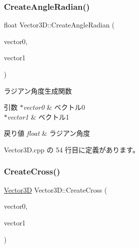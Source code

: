 \subsubsection{\texorpdfstring{Create\+Angle\+Radian()}{CreateAngleRadian()}}
{\footnotesize\ttfamily float Vector3\+D\+::\+Create\+Angle\+Radian (\begin{DoxyParamCaption}\item[{\mbox{\hyperlink{class_vector3_d}{Vector3D}} $\ast$}]{vector0,  }\item[{\mbox{\hyperlink{class_vector3_d}{Vector3D}} $\ast$}]{vector1 }\end{DoxyParamCaption})\hspace{0.3cm}{\ttfamily [static]}}



ラジアン角度生成関数 


\begin{DoxyParams}{引数}
{\em $\ast$vector0} & ベクトル0 \\
\hline
{\em $\ast$vector1} & ベクトル1 \\
\hline
\end{DoxyParams}

\begin{DoxyRetVals}{戻り値}
{\em float} & ラジアン角度 \\
\hline
\end{DoxyRetVals}


 Vector3\+D.\+cpp の 54 行目に定義があります。

\mbox{\label{class_vector3_d_a7520b0efa372a10ab9a5a5f312bf999e}} 
\subsubsection{\texorpdfstring{Create\+Cross()}{CreateCross()}}
{\footnotesize\ttfamily \mbox{\hyperlink{class_vector3_d}{Vector3D}} Vector3\+D\+::\+Create\+Cross (\begin{DoxyParamCaption}\item[{\mbox{\hyperlink{class_vector3_d}{Vector3D}} $\ast$}]{vector0,  }\item[{\mbox{\hyperlink{class_vector3_d}{Vector3D}} $\ast$}]{vector1 }\end{DoxyParamCaption})\hspace{0.3cm}{\ttfamily [static]}}



